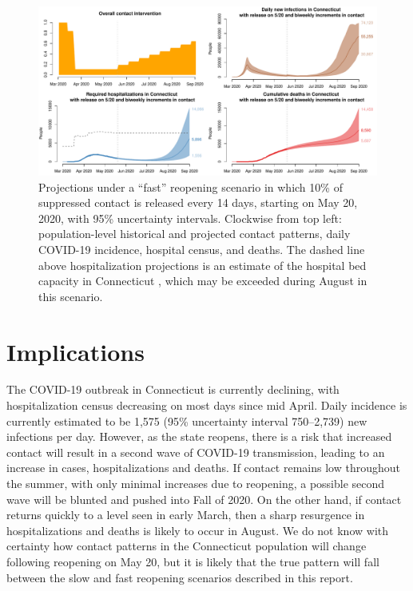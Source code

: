 \documentclass[11pt]{article}
\begin{document}
\begin{figure}
\centering
\includegraphics[width=\textwidth]{figures/fast.pdf}
\caption{Projections under a ``fast'' reopening scenario in which 10\% of suppressed contact is released every 14 days, starting on May 20, 2020, with 95\% uncertainty intervals.  Clockwise from top left: population-level historical and projected contact patterns, daily COVID-19 incidence, hospital census, and deaths. The dashed line above hospitalization projections is an estimate of the hospital bed capacity in Connecticut \citep{CHAwebsite}, which may be exceeded during August in this scenario. }
\label{fig:fast}
\end{figure}








\section*{Implications}

The COVID-19 outbreak in Connecticut is currently declining, with hospitalization census decreasing on most days since mid April.  Daily incidence is currently estimated to be 1,575 (95\% uncertainty interval 750--2,739) new infections per day.  However, as the state reopens, there is a risk that increased contact will result in a second wave of COVID-19 transmission, leading to an increase in cases, hospitalizations and deaths. If contact remains low throughout the summer, with only minimal increases due to reopening, a possible second wave will be blunted and pushed into Fall of 2020.  On the other hand, if contact returns quickly to a level seen in early March, then a sharp resurgence in hospitalizations and deaths is likely to occur in August.  We do not know with certainty how contact patterns in the Connecticut population will change following reopening on May 20, but it is likely that the true pattern will fall between the slow and fast reopening scenarios described in this report.  
\end{document}
